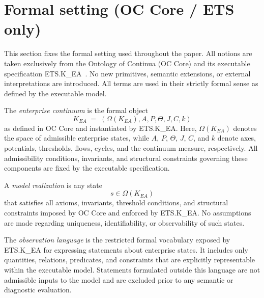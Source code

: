 ﻿\section{Formal setting (OC Core / ETS only)}

This section fixes the formal setting used throughout the paper.
All notions are taken exclusively from the Ontology of Continua (OC Core)
and its executable specification ETS.K\_EA~\cite{occore,etsk_ea}.
No new primitives, semantic extensions, or external interpretations are
introduced.
All terms are used in their strictly formal sense as defined by the
executable model.

\medskip

\begin{definition}
The \emph{enterprise continuum} is the formal object
\[
K_{EA} \;=\; (\Omega(K_{EA}), A, P, \Theta, J, C, k)
\]
as defined in OC Core and instantiated by ETS.K\_EA.
Here, \(\Omega(K_{EA})\) denotes the space of admissible enterprise states,
while \(A\), \(P\), \(\Theta\), \(J\), \(C\), and \(k\) denote axes,
potentials, thresholds, flows, cycles, and the continuum measure,
respectively.
All admissibility conditions, invariants, and structural constraints
governing these components are fixed by the executable specification.
\end{definition}

\medskip

\begin{definition}
A \emph{model realization} is any state
\[
s \in \Omega(K_{EA})
\]
that satisfies all axioms, invariants, threshold conditions, and structural
constraints imposed by OC Core and enforced by ETS.K\_EA.
No assumptions are made regarding uniqueness, identifiability, or
observability of such states.
\end{definition}

\medskip

\begin{definition}
The \emph{observation language} is the restricted formal vocabulary exposed
by ETS.K\_EA for expressing statements about enterprise states.
It includes only quantities, relations, predicates, and constraints that
are explicitly representable within the executable model.
Statements formulated outside this language are not admissible inputs to
the model and are excluded prior to any semantic or diagnostic evaluation.
\end{definition}

\medskip

